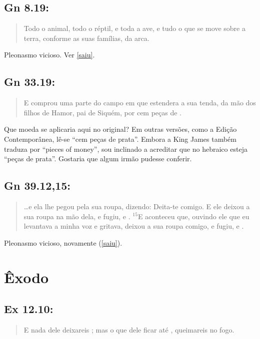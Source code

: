 \subsection*{Gn 8.19:} 
\begin{quote}
    \small
Todo o animal, todo o réptil, e toda a ave, e tudo o que se move sobre a terra, conforme as suas famílias,  da arca.
\end{quote}

Pleonasmo vicioso. Ver \ref{saiu}.

\subsection*{Gn 33.19:} 
\begin{quote}
    \small
E comprou uma parte do campo em que estendera a sua tenda, da mão dos filhos de Hamor, pai de Siquém, por cem peças de .
\end{quote}

Que moeda se aplicaria aqui no original? Em outras versões, como a Edição Contemporânea, lê-se ``cem peças de prata''. Embora a King James também traduza por ``pieces of money'', sou inclinado a acreditar que no hebraico esteja ``peças de prata''. Gostaria que algum irmão pudesse conferir.

\subsection*{Gn 39.12,15:}
 \begin{quote}
    \small
\ldots e ela lhe pegou pela sua roupa, dizendo: Deita-te comigo. E ele deixou a sua roupa na mão dela, e fugiu, e . $^{\mathrm{15}}$E aconteceu que, ouvindo ele que eu levantava a minha voz e gritava, deixou a sua roupa comigo, e fugiu, e .
\end{quote}

Pleonasmo vicioso, novamente (\ref{saiu}).

\section{Êxodo}
\subsection*{Ex 12.10:} 
\begin{quote}
    \small
E nada dele deixareis ; mas o que dele ficar até , queimareis no fogo.
\end{quote}

